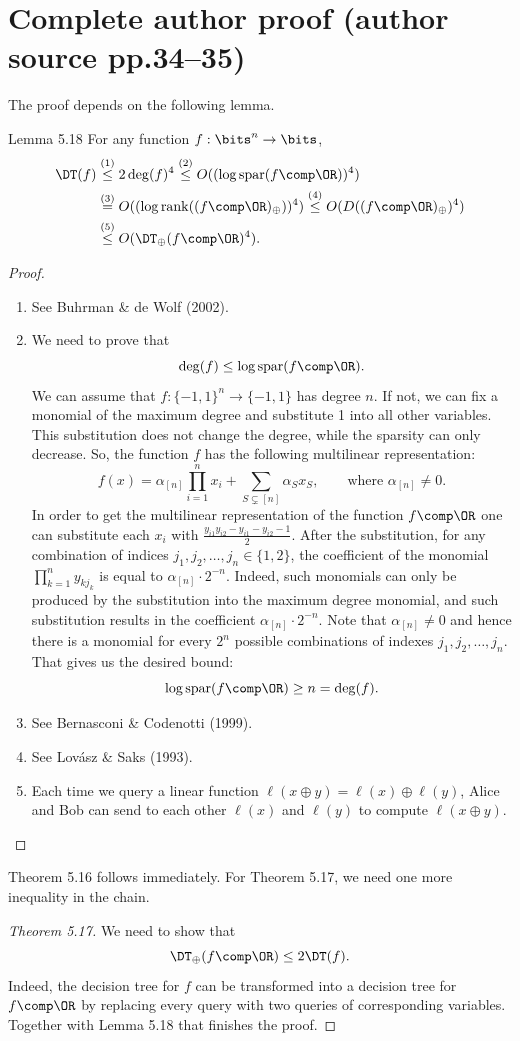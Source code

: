 \section*{Complete author proof (author source pp.34--35)}
The proof depends on the following lemma.
\begin{originalresult}{Lemma 5.18}
For any function $f:\bits^n\to\bits$,
\begin{align*}
\DT(f)&\overset{(1)}\le2\deg(f)^4\overset{(2)}\le O((\log\operatorname{spar}(f\comp\OR))^4)\\
&\overset{(3)}=O((\log\operatorname{rank}((f\comp\OR)_\oplus))^4)\overset{(4)}\le O(D((f\comp\OR)_\oplus)^4)\\
&\overset{(5)}\le O(\DT_\oplus(f\comp\OR)^4).
\end{align*}
\end{originalresult}
\begin{proof}
\begin{enumerate}
\item[(1)] See Buhrman \& de Wolf (2002).
\item[(2)] We need to prove that
\[\deg(f)\le\log\operatorname{spar}(f\comp\OR).\]
We can assume that $f:\{-1,1\}^n\to\{-1,1\}$ has degree $n$. If not, we can fix a monomial of the maximum degree and substitute 1 into all other variables. This substitution does not change the degree, while the sparsity can only decrease. So, the function $f$ has the following multilinear representation:
\[f(x)=\alpha_{[n]}\prod_{i=1}^n x_i+\sum_{S\subsetneq[n]}\alpha_Sx_S,\qquad\text{where }\alpha_{[n]}\ne0.\]
In order to get the multilinear representation of the function $f\comp\OR$ one can substitute each $x_i$ with $\frac{y_{i1}y_{i2}-y_{i1}-y_{i2}-1}{2}$. After the substitution, for any combination of indices $j_1,j_2,\ldots,j_n\in\{1,2\}$, the coefficient of the monomial $\prod_{k=1}^n y_{kj_k}$ is equal to $\alpha_{[n]}\cdot2^{-n}$. Indeed, such monomials can only be produced by the substitution into the maximum degree monomial, and such substitution results in the coefficient $\alpha_{[n]}\cdot2^{-n}$.
Note that $\alpha_{[n]}\ne0$ and hence there is a monomial for every $2^n$ possible combinations of indexes $j_1,j_2,\ldots,j_n$. That gives us the desired bound:
\[\log\operatorname{spar}(f\comp\OR)\ge n=\deg(f).\]
\item[(3)] See Bernasconi \& Codenotti (1999).
\item[(4)] See Lov\'asz \& Saks (1993).
\item[(5)] Each time we query a linear function $\ell(x\oplus y)=\ell(x)\oplus\ell(y)$, Alice and Bob can send to each other $\ell(x)$ and $\ell(y)$ to compute $\ell(x\oplus y)$.
\end{enumerate}
\end{proof}
Theorem 5.16 follows immediately. For Theorem 5.17, we need one more inequality in the chain.
\begin{proof}[Theorem 5.17]
We need to show that
\[\DT_\oplus(f\comp\OR)\le2\DT(f).\]
Indeed, the decision tree for $f$ can be transformed into a decision tree for $f\comp\OR$ by replacing every query with two queries of corresponding variables. Together with Lemma 5.18 that finishes the proof.
\end{proof}
